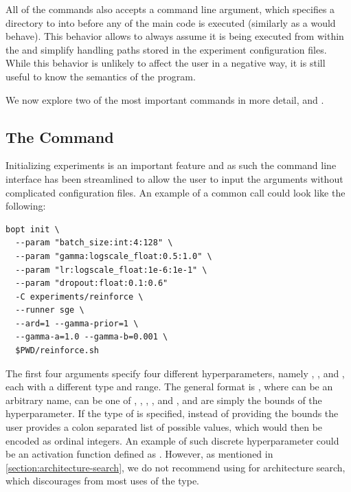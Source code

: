 All of the \bopt commands also accepts a  command line argument, which specifies a directory to  into before any of the main code is executed (similarly as a  would behave). This behavior allows \bopt to always assume it is being executed from within the  and simplify handling paths stored in the experiment configuration files. While this behavior is unlikely to affect the user in a negative way, it is still useful to know the semantics of the program.

We now explore two of the most important commands in more detail,  and .

\subsection{The  Command}

Initializing experiments is an important feature and as such the command line interface has been streamlined to allow the user to input the arguments without complicated configuration files. An example of a common  call could look like the following:

\begin{center}
\begin{verbatim}
bopt init \
  --param "batch_size:int:4:128" \
  --param "gamma:logscale_float:0.5:1.0" \
  --param "lr:logscale_float:1e-6:1e-1" \
  --param "dropout:float:0.1:0.6"
  -C experiments/reinforce \
  --runner sge \
  --ard=1 --gamma-prior=1 \
  --gamma-a=1.0 --gamma-b=0.001 \
  $PWD/reinforce.sh
\end{verbatim}	
\end{center}


The first four arguments specify four different hyperparameters, namely , ,  and , each with a different type and range. The general format is , where  can be an arbitrary name,  can be one of , , , , and , and  are simply the bounds of the hyperparameter. If the type of  is specified, instead of providing the bounds the user provides a colon separated list of possible values, which would then be encoded as ordinal integers. An example of such discrete hyperparameter could be an activation function defined as . However, as mentioned in \autoref{section:architecture-search}, we do not recommend using \bopt for architecture search, which discourages from most uses of the  type.

